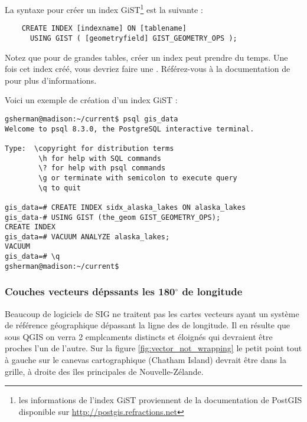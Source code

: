 La syntaxe pour créer un index GiST\footnote{les informations de l'index GiST proviennent de la documentation de PostGIS disponible sur \url{http://postgis.refractions.net}} est la suivante :

\begin{verbatim}
    CREATE INDEX [indexname] ON [tablename]
      USING GIST ( [geometryfield] GIST_GEOMETRY_OPS );
\end{verbatim}

Notez que pour de grandes tables, créer un index peut prendre du temps. Une fois cet index créé, vous devriez faire une . Référez-vous à la documentation de \cite{PostGISweb} pour plus d'informations.

Voici un exemple de création d'un index GiST :
\begin{verbatim}
gsherman@madison:~/current$ psql gis_data
Welcome to psql 8.3.0, the PostgreSQL interactive terminal.

Type:  \copyright for distribution terms
        \h for help with SQL commands
        \? for help with psql commands
        \g or terminate with semicolon to execute query
        \q to quit

gis_data=# CREATE INDEX sidx_alaska_lakes ON alaska_lakes
gis_data-# USING GIST (the_geom GIST_GEOMETRY_OPS);
CREATE INDEX
gis_data=# VACUUM ANALYZE alaska_lakes;
VACUUM
gis_data=# \q
gsherman@madison:~/current$
\end{verbatim}

\subsubsection{Couches vecteurs dépssants les 180$^\circ$ de longitude}

Beaucoup de logiciels de SIG ne traitent pas les cartes vecteurs  ayant un système de référence géographique dépassant la ligne des  de longitude. Il en résulte que sous QGIS on verra 2 emplcaments distincts et éloignés qui devraient être proches l'un de l'autre. Sur la figure \ref{fig:vector_not_wrapping} le petit point tout à gauche sur le canevas cartographique (Chatham Island) devrait être dans la grille, à droite des îles principales de Nouvelle-Zélande.

